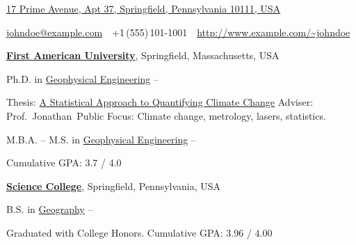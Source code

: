 \documentclass[letterpaper,MMMyyyy,nonstopmode]{./simple-resume-cv-master/simpleresumecv}
\newcommand{\CVAuthor}{John Doe}
\newcommand{\CVWebpage}{http://www.example.com/~johndoe}
\begin{document}
\Title{\CVAuthor}

\begin{SubTitle}
	\href{https://www.google.com/maps/place/17+Prime+Avenue,+Springfield,+Pennsylvania+10111,+USA}
	{17 Prime Avenue, Apt 37, Springfield, Pennsylvania 10111, USA}
	\par
	\href{mailto:johndoe@example.com}
	{johndoe@example.com}
	\,\SubBulletSymbol\,
	+1\,(555)\,101-1001
	\,\SubBulletSymbol\,
	\href{\CVWebpage}
	{\url{\CVWebpage}}
\end{SubTitle}

\begin{Body}


\Entry
\href{http://www.example.com/my-university}
{\textbf{First American University}},
Springfield, Massachusetts, USA

\Gap
\BulletItem
	Ph.D. in
	\href{http://www.example.com/my-department}
	{Geophysical Engineering}
	\hfill
	 --
\begin{Detail}
	\SubBulletItem
		Thesis:
		\href{http://www.example.com/my-phd-thesis}
		{A Statistical Approach to Quantifying Climate Change}
	\SubBulletItem
		Adviser:
		Prof.~Jonathan~Public
	\SubBulletItem
		Focus:
		Climate change, metrology, lasers, statistics.
\end{Detail}

\Gap
\BulletItem
	M.B.A.
	\hfill
	 --
\Gap
\BulletItem
	M.S. in
	\href{http://www.example.com/my-department}
	{Geophysical Engineering}
	\hfill
	 --
\begin{Detail}
	\SubBulletItem
	Cumulative GPA: 3.7 / 4.0
\end{Detail}

\BigGap
\Entry
\href{http://www.example.com/my-college}
{\textbf{Science College}},
Springfield, Pennsylvania, USA

\Gap
\BulletItem
	B.S. in
	\href{http://www.example.com/my-department}
	{Geography}
	\hfill
	 --
\begin{Detail}
	\SubBulletItem
		Graduated with College Honors.
	\SubBulletItem
		Cumulative GPA: 3.96 / 4.00
\end{Detail}



\end{Body}
\end{document}
